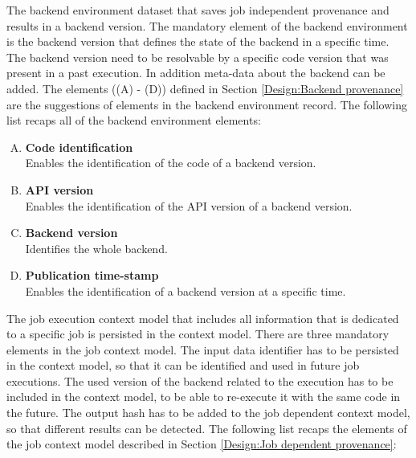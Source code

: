 \documentclass[draft,final]{vutinfth} %
\begin{document}
The backend environment dataset that saves job independent provenance and results in a backend version. The mandatory element of the backend environment is the backend version that defines the state of the backend in a specific time. The backend version need to be resolvable by a specific code version that was present in a past execution. In addition meta-data about the backend can be added. The elements ((A) - (D)) defined in Section \ref{Design:Backend provenance} are the suggestions of elements in the backend environment record. The following list recaps all of the backend environment elements: 

\begin{enumerate}[(A)]
	\item \textbf{Code identification} \\
	Enables the identification of the code of a backend version.
	\item \textbf{API version} \\
	Enables the identification of the API version of a backend version.
	\item \textbf{Backend version} \\ 
	Identifies the whole backend.
	\item \textbf{Publication time-stamp} \\ 
	Enables the identification of a backend version at a specific time.
\end{enumerate}

The job execution context model that includes all information that is dedicated to a specific job is persisted in the context model. There are three mandatory elements in the job context model. The input data identifier has to be persisted in the context model, so that it can be identified and used in future job executions. The used version of the backend related to the execution has to be included in the context model, to be able to re-execute it with the same code in the future. The output hash has to be added to the job dependent context model, so that different results can be detected. The following list recaps the elements of the job context model described in Section \ref{Design:Job dependent provenance}: 
\end{document}
